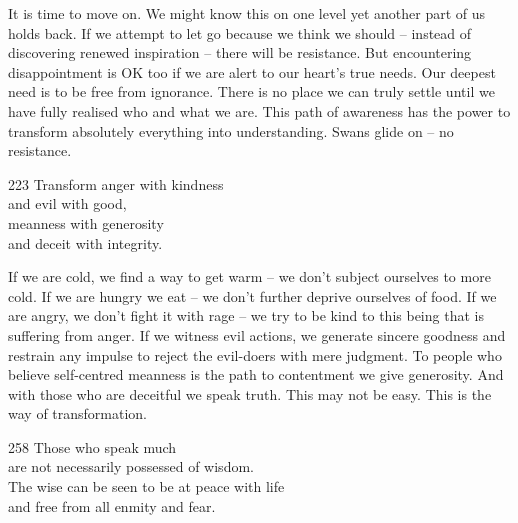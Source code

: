 \begin{dhpRefl}

It is time to move on. We might know this on one level yet another
part of us holds back. If we attempt to let go because we think we
should -- instead of discovering renewed inspiration -- there will be
resistance. But encountering disappointment is OK too if we are alert
to our heart's true needs. Our deepest need is to be free from
ignorance. There is no place we can truly settle until we have fully
realised who and what we are. This path of awareness has the power to
transform absolutely everything into understanding. Swans glide on --
no resistance.

\end{dhpRefl}


\begin{dhpVerse}{223}
\label{dhp-223}
Transform anger with kindness\\
and evil with good,\\
meanness with generosity\\
and deceit with integrity.
\end{dhpVerse}

\begin{dhpRefl}

If we are cold, we find a way to get warm -- we don't subject
ourselves to more cold. If we are hungry we eat -- we don't further
deprive ourselves of food. If we are angry, we don't fight it with
rage -- we try to be kind to this being that is suffering from anger.
If we witness evil actions, we generate sincere goodness and restrain
any impulse to reject the evil-doers with mere judgment. To people
who believe self-centred meanness is the path to contentment we give
generosity. And with those who are deceitful we speak truth. This may
not be easy. This is the way of transformation.

\end{dhpRefl}


\begin{dhpVerse}{258}
\label{dhp-258}
Those who speak much\\
are not necessarily possessed of wisdom.\\
The wise can be seen to be at peace with life\\
and free from all enmity and fear.
\end{dhpVerse}

